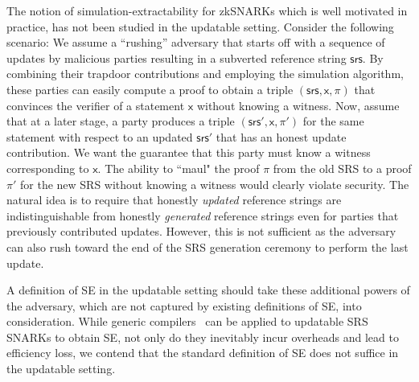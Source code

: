 \documentclass[10pt]{llncs}
\newcommand{\pcvarstyle}[1]{\mathsf{#1}}
\newcommand{\srs}{\pcvarstyle{srs}}
\newcommand{\inp}{\pcvarstyle{x}}
\DeclareRobustCommand{\markulf}[2] {}%
\begin{document}
The notion of simulation-extractability for zkSNARKs which is well motivated in practice, has not been studied in the updatable setting.
Consider the following scenario: We assume a ``rushing'' adversary that starts off with a sequence of updates by malicious parties resulting in a subverted reference string $\srs$. By combining their trapdoor contributions and employing the simulation algorithm, these parties can easily compute a proof to obtain a triple $(\srs,\inp,\pi)$  that convinces the verifier of a statement $\inp$ without knowing a witness. Now, assume that at a later stage, a party produces a triple $(\srs',\inp,\pi')$ for the same statement with respect to an updated $\srs'$ that has an honest update contribution. We want the guarantee that this party must know a witness corresponding to $\inp$. The ability to ``maul" the proof $\pi$ from the old SRS to a proof $\pi'$ for the new SRS without knowing a witness would clearly violate security. The natural idea is to require that honestly \emph{updated} reference strings are indistinguishable from honestly \emph{generated} reference strings even for parties that previously contributed updates. However, this is not sufficient as the adversary can also rush toward the end of the SRS generation ceremony to perform the last update.


A definition of SE in the updatable setting should take these additional powers of the adversary, which are not captured by existing definitions of SE, into consideration.
While generic compilers~\cite{EPRINT:KZMQCP15,CCS:AbdRamSla20} can be applied to updatable SRS SNARKs to obtain SE, not only do they inevitably incur overheads and lead to efficiency loss, we contend that the standard definition of SE does not suffice in the updatable setting.
\end{document}
